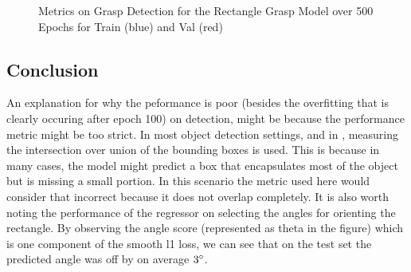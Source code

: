 \documentclass{article}
\begin{document}
\begin{figure}
\centering
{}
\qquad
{}
\qquad
{}
\caption{Metrics on Grasp Detection for the Rectangle Grasp Model over 500 Epochs for Train (blue) and Val (red)}
\label{fig:rgrasp_detection}
\end{figure}

\subsection{Conclusion}
An explanation for why the peformance is poor (besides the overfitting
that is clearly occuring after epoch 100) on detection, might be because
the performance metric might be too strict. In most object detection settings,
and in \cite{zhou18, zhang18}, measuring the intersection over union of the
bounding boxes is used. This is because in many cases, the model might predict
a box that encapsulates most of the object but is missing a small portion. In
this scenario the metric used here would consider that incorrect because it
does not overlap completely. It is also worth noting the performance of the
regressor on selecting the angles for orienting the rectangle. By observing
the angle score (represented as theta in the figure) which is one component of
the smooth l1 loss, we can see that on the test set the predicted angle was off
by on average $3\degree$.
\end{document}
